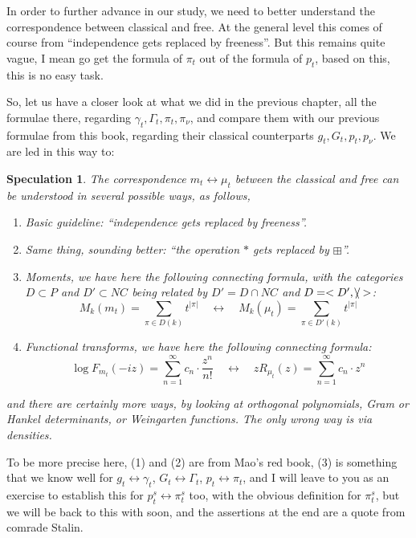 \documentclass[12pt]{amsbook}
\newtheorem{speculation}[theorem]{Speculation}
\begin{document}
In order to further advance in our study, we need to better understand the correspondence between classical and free. At the general level this comes of course from ``independence gets replaced by freeness''. But this remains quite vague, I mean go get the formula of $\pi_t$ out of the formula of $p_t$, based on this, this is no easy task.

\bigskip

So, let us have a closer look at what we did in the previous chapter, all the formulae there, regarding $\gamma_t,\Gamma_t,\pi_t,\pi_\nu$, and compare them with our previous formulae from this book, regarding their classical counterparts $g_t,G_t,p_t,p_\nu$. We are led in this way to:

\begin{speculation}
The correspondence $m_t\leftrightarrow\mu_t$ between the classical and free can be understood in several possible ways, as follows,
\begin{enumerate}
\item Basic guideline: ``independence gets replaced by freeness''.

\item Same thing, sounding better: ``the operation $*$ gets replaced by $\boxplus$''.

\item Moments, we have here the following connecting formula, with the categories $D\subset P$ and $D'\subset NC$ being related by $D'=D\cap NC$ and $D=<D',\slash\hskip-2.1mm\backslash>$:
$$M_k(m_t)=\sum_{\pi\in D(k)}t^{|\pi|}\quad \longleftrightarrow\quad M_k(\mu_t)=\sum_{\pi\in D'(k)}t^{|\pi|}$$

\item Functional transforms, we have here the following connecting formula:
$$\log F_{m_t}(-iz)=\sum_{n=1}^\infty c_n\cdot\frac{z^n}{n!}
\quad \longleftrightarrow\quad zR_{\mu_t}(z)=\sum_{n=1}^\infty c_n\cdot z^n$$
\end{enumerate}
and there are certainly more ways, by looking at orthogonal polynomials, Gram or Hankel determinants, or Weingarten functions. The only wrong way is via densities.
\end{speculation}

To be more precise here, (1) and (2) are from Mao's red book, (3) is something that we know well for $g_t\leftrightarrow\gamma_t$, $G_t\leftrightarrow\Gamma_t$, $p_t\leftrightarrow\pi_t$, and I will leave to you as an exercise to establish this for $p^s_t\leftrightarrow\pi^s_t$ too, with the obvious definition for $\pi^s_t$, but we will be back to this with soon, and the assertions at the end are a quote from comrade Stalin.
\end{document}
